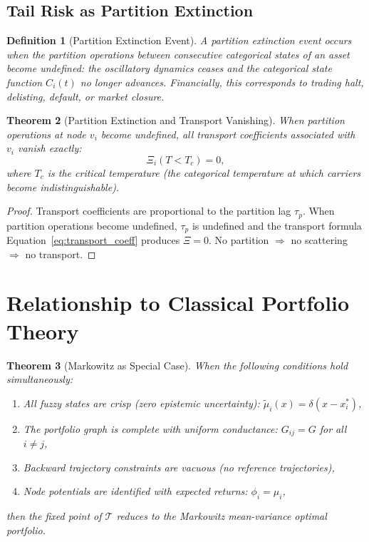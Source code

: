 \documentclass[twocolumn,10pt]{article}
\newtheorem{theorem}{Theorem}[section]
\newtheorem{definition}[theorem]{Definition}
\theoremstyle{remark}
\newcommand{\fuzzyset}[1]{\tilde{\mu}_{#1}}
\newcommand{\Tcomp}{\mathcal{T}}
\newcommand{\eqnref}[1]{Equation~\ref{#1}}
\begin{document}
\subsection{Tail Risk as Partition Extinction}

\begin{definition}[Partition Extinction Event]
\label{def:extinction}
A \emph{partition extinction event} occurs when the partition operations between consecutive categorical states of an asset become undefined: the oscillatory dynamics ceases and the categorical state function $C_i(t)$ no longer advances.  Financially, this corresponds to trading halt, delisting, default, or market closure.
\end{definition}

\begin{theorem}[Partition Extinction and Transport Vanishing]
\label{thm:extinction}
When partition operations at node $v_i$ become undefined, all transport coefficients associated with $v_i$ vanish exactly:
\begin{equation}
    \Xi_i(T < T_c) = 0,
    \label{eq:extinction}
\end{equation}
where $T_c$ is the critical temperature (the categorical temperature at which carriers become indistinguishable).
\end{theorem}

\begin{proof}
Transport coefficients are proportional to the partition lag $\tau_p$.  When partition operations become undefined, $\tau_p$ is undefined and the transport formula \eqnref{eq:transport_coeff} produces $\Xi = 0$.  No partition $\Rightarrow$ no scattering $\Rightarrow$ no transport.
\end{proof}


\section{Relationship to Classical Portfolio Theory}
\label{sec:classical_limit}

\begin{theorem}[Markowitz as Special Case]
\label{thm:markowitz_limit}
When the following conditions hold simultaneously:
\begin{enumerate}[label=(\roman*)]
    \item All fuzzy states are crisp (zero epistemic uncertainty): $\fuzzyset{i}(x) = \delta(x - x_i^*)$,
    \item The portfolio graph is complete with uniform conductance: $G_{ij} = G$ for all $i \neq j$,
    \item Backward trajectory constraints are vacuous (no reference trajectories),
    \item Node potentials are identified with expected returns: $\phi_i = \mu_i$,
\end{enumerate}
then the fixed point of $\Tcomp$ reduces to the Markowitz mean-variance optimal portfolio.
\end{theorem}
\end{document}

